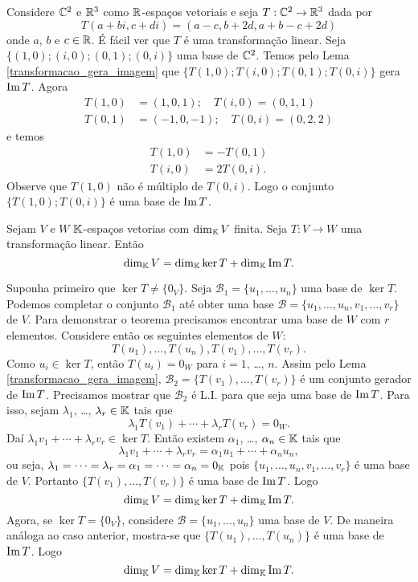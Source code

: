 \begin{exemplo}
	Considere $\mathbb{C}^2$ e $\mathbb{R}^3$ como $\mathbb{R}$-espaços vetoriais e seja $T : \mathbb{C}^2 \to \mathbb{R}^3$ dada por
	\[
		T(a+bi, c+di) = (a - c, b + 2d, a + b - c + 2d)
	\]
	onde $a$, $b$ e $c \in \mathbb{R}$. É fácil ver que $T$ é uma transformação linear. Seja $\{(1,0);(i,0);(0,1);(0,i)\}$ uma base de $\mathbb{C}^2$. Temos pelo Lema \ref{transformacao_gera_imagem} que $\{T(1,0);T(i,0);T(0,1);T(0,i)\}$ gera ${\rm Im\,} T$. Agora
	\begin{align*}
		T(1,0) &= (1,0,1);\quad T(i,0) = (0,1,1)\\
		T(0,1) &= (-1,0,-1);\quad T(0,i) = (0,2,2)
	\end{align*}
	e temos
	\begin{align*}
		T(1,0) &= -T(0,1)\\
		T(i,0) &= 2T(0,i).
	\end{align*}
	Observe que $T(1,0)$ não é múltiplo de $T(0,i)$. Logo o conjunto $\{T(1,0); T(0,i)\}$ é uma base de ${\rm Im\,} T$.
\end{exemplo}

\begin{teorema}\label{teorema_do_nucleo_e_da_imagem}
	Sejam $V$ e $W$ $\mathbb{K}$-espaços vetorias com $\dim_{\mathbb{K}}V$ finita. Seja $T : V \to W$ uma transformação linear. Então
	\[
		\dim_{\mathbb{K}}V = \dim_{\mathbb{K}}\ker T + \dim_{\mathbb{K}}{\rm Im\,} T.
	\]
\end{teorema}
\begin{prova}
	Suponha primeiro que $\ker T \ne \{0_V\}$. Seja $\mathcal{B}_1 = \{u_1, \dots, u_n\}$ uma base de $\ker T$. Podemos completar o conjunto $\mathcal{B}_1$ até obter uma base $\mathcal{B} = \{u_1, \dots, u_n, v_1, \dots, v_r\}$ de $V$. Para demonstrar o teorema precisamos encontrar uma base de $W$ com $r$ elementos. Considere então os seguintes elementos de $W$:
	\[
		T(u_1), \dots, T(u_n), T(v_1), \dots, T(v_r).
	\]
	Como $u_i \in \ker T$, então $T(u_i) = 0_W$ para $i = 1$, \dots, $n$. Assim pelo Lema \ref{transformacao_gera_imagem}, $\mathcal{B}_2 = \{T(v_1), \dots, T(v_r)\}$ é um conjunto gerador de ${\rm Im\,} T$. Precisamos mostrar que $\mathcal{B}_2$ é L.I. para que seja uma base de ${\rm Im\,} T$. Para isso, sejam $\lambda_1$, \dots, $\lambda_r \in \mathbb{K}$ tais que
	\[
		\lambda_1T(v_1) + \cdots + \lambda_rT(v_r) = 0_W.
	\]
	Daí $\lambda_1v_1 + \cdots + \lambda_rv_r \in \ker T$. Então existem $\alpha_1$, \dots, $\alpha_n \in \mathbb{K}$ tais que
	\[
		\lambda_1v_1 + \cdots + \lambda_rv_r = \alpha_1u_1 + \cdots + \alpha_nu_n,
	\]
	ou seja, $\lambda_1 = \cdots = \lambda_r = \alpha_1 = \cdots = \alpha_n = 0_{\mathbb{K}}$ pois $\{u_1, \dots, u_n, v_1, \dots, v_r\}$ é uma base de $V$. Portanto $\{T(v_1), \dots, T(v_r)\}$ é uma base de ${\rm Im\,} T$. Logo
	\[
		\dim_{\mathbb{K}}V = \dim_{\mathbb{K}}\ker T + \dim_{\mathbb{K}}{\rm Im\,} T.
	\]
	Agora, se $\ker T = \{0_V\}$, considere $\mathcal{B} = \{u_1, \dots, u_n\}$ uma base de $V$. De maneira análoga ao caso anterior, mostra-se que $\{T(u_1), \dots, T(u_n)\}$ é uma base de ${\rm Im\,} T$. Logo
	\[
		\dim_{\mathbb{K}}V = \dim_{\mathbb{K}}\ker T + \dim_{\mathbb{K}}{\rm Im\,} T.
	\]
\end{prova}

